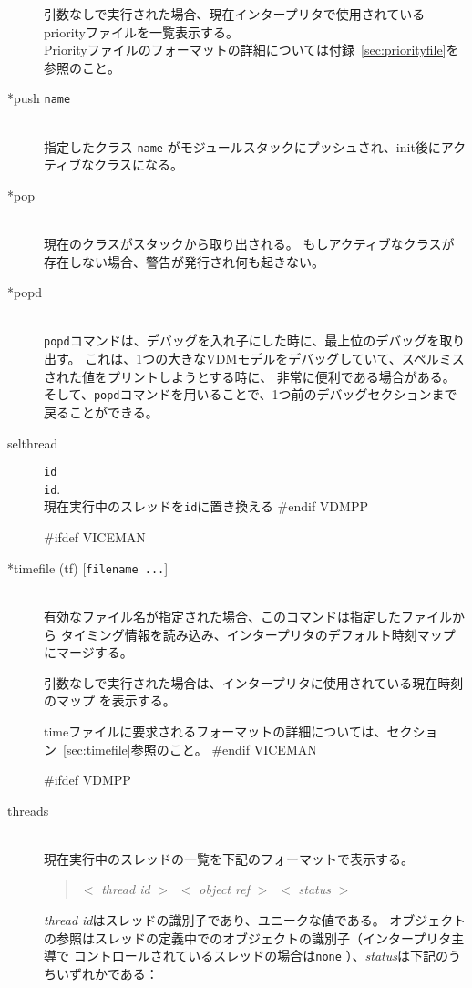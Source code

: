 \documentclass[\pformat,12pt]{article}
\begin{document}
\begin{description}
  引数なしで実行された場合、現在インタープリタで使用されているpriorityファイルを一覧表示する。\\

  Priorityファイルのフォーマットの詳細については付録~\ref{sec:priorityfile}を参照のこと。

\item[*push {\tt name}] \mbox{}\\
  指定したクラス {\tt name} がモジュールスタックにプッシュされ、init後にアクティブなクラスになる。 

\item[*pop] \mbox{}\\
  現在のクラスがスタックから取り出される。
  もしアクティブなクラスが存在しない場合、警告が発行され何も起きない。
  
\item[*popd] \mbox{}\\
  {\tt popd}コマンドは、デバッグを入れ子にした時に、最上位のデバッグを取り出す。
  これは、1つの大きなVDMモデルをデバッグしていて、スペルミスされた値をプリントしようとする時に、
  非常に便利である場合がある。
  そして、{\tt popd}コマンドを用いることで、1つ前のデバッグセクションまで戻ることができる。

\item[selthread]\texttt{id}\mbox{}\\
  \texttt{id}. \\
  現在実行中のスレッドを\texttt{id}に置き換える
#endif VDMPP

#ifdef VICEMAN
\item[*timefile (tf) \mbox{[{\tt filename ...}]}] \mbox{}\\
  有効なファイル名が指定された場合、このコマンドは指定したファイルから
  タイミング情報を読み込み、インタープリタのデフォルト時刻マップにマージする。

  引数なしで実行された場合は、インタープリタに使用されている現在時刻のマップ
  を表示する。
  
  timeファイルに要求されるフォーマットの詳細については、セクション~\ref{sec:timefile}参照のこと。
#endif VICEMAN

#ifdef VDMPP
\item[threads]\mbox{}\\
現在実行中のスレッドの一覧を下記のフォーマットで表示する。
\begin{quote}
  $<$ \textit{thread id} $>$\ $<$ \textit{object ref} $>$\ $<$
\textit{status} $>$
\end{quote}
\textit{thread id}はスレッドの識別子であり、ユニークな値である。
オブジェクトの参照はスレッドの定義中でのオブジェクトの識別子（インタープリタ主導で
コントロールされているスレッドの場合は\texttt{none} ）、\textit{status}は下記のうちいずれかである：


\end{description}
\end{document}
